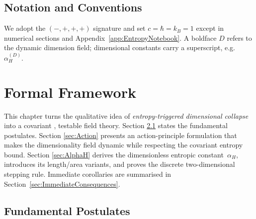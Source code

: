 \documentclass[a4paper, 12pt, oneside]{book}
\numberwithin{equation}{chapter}
\begin{document}
\section{Notation and Conventions}

We adopt the $(-,+,+,+)$ signature and set $c=\hbar=k_B=1$ except in
numerical sections and Appendix~\ref{app:EntropyNotebook}.  A boldface $D$ refers to the dynamic
dimension field; dimensional constants carry a superscript, e.g.\
$\alpha_H^{(D)}$.



\chapter[Formal Framework]{Formal Framework}
\label{chap:FormalFramework}

\noindent
This chapter turns the qualitative idea of \emph{entropy-triggered dimensional
collapse} into a covariant \cite{Bousso1999}, testable field theory.  Section \ref{sec:Postulates}
states the fundamental postulates.  Section \ref{sec:Action} presents an
action-principle formulation that makes the dimensionality field dynamic while
respecting the covariant entropy \cite{Bousso1999} bound.  Section \ref{sec:AlphaH} derives the
dimensionless entropic constant~$\alpha_H$, introduces its length/area
variants, and proves the discrete two-dimensional stepping rule.
Immediate corollaries are summarised in
Section~\ref{sec:ImmediateConsequences}.

\section{Fundamental Postulates}
\label{sec:Postulates}
\end{document}
